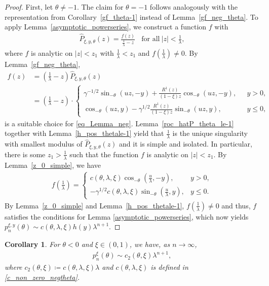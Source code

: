 \documentclass[12pt]{article}
\newcommand{\1}{\mathds{1}}
\theoremstyle{definition}
\theoremstyle{plain}
\newtheorem{Corollary}[definition]{Corollary}
\theoremstyle{remark}
\begin{document}
\begin{proof}
    First, let $\theta\neq -1$. The claim for $\theta=-1$ follows analogously with the representation from Corollary~\ref{gf_theta-1} instead of Lemma~\ref{gf_neg_theta}. To apply Lemma~\ref{asymptotic_powerseries}, we construct a function $f$ with
    \begin{align}
        \hat{P}_{\xi,y,\theta}(z)=\frac{f(z)}{\frac{1}{\lambda}-z}~~~~\text{for all}~|z|<\frac{1}{\lambda}\label{eq_Lemma_neg},
    \end{align}
   where $f$ is analytic on $|z|<z_1$ with $\frac{1}{\lambda}<z_1$ and $f\left(\frac{1}{\lambda}\right)\neq 0$. By Lemma~\ref{gf_neg_theta}, 
   \begin{align*}
        f(z)&=  \left(\frac{1}{\lambda}-z\right)\hat{P}_{\xi,y,\theta}(z)
        \\&=\left(\frac{1}{\lambda}-z\right)\cdot
      \begin{cases}
          \gamma^{-1/2}\sin_{-\theta}(uz,-y)+\frac{R^1(z)}{(1-\xi) z}\cos_{-\theta}(uz,-y),~~~&y>0,
          \\\cos_{-\theta}(uz,y)
     -\gamma^{1/2}\frac{R^1(z)}{(1-\xi) z}\sin_{-\theta}(uz,y),&y\le 0,
     \end{cases}
   \end{align*}
   is a suitable choice for \eqref{eq_Lemma_neg}. Lemma~\ref{roc_hatP_theta_le-1} together with Lemma~\ref{h_pos_thetale-1} yield that $\frac{1}{\lambda}$ is the unique singularity with smallest modulus of $\hat{P}_{\xi,y,\theta}(z)$ and it is simple and isolated. In particular, there is some $z_1>\frac{1}{\lambda}$ such that the function $f$ is analytic on $|z|<z_1$. By Lemma~\ref{z_0_simple}, we have
   \begin{align*}
       f\left(\frac{1}{\lambda}\right)=\begin{cases}
         c(\theta,\lambda,\xi)\cos_{-\theta}\left(\frac{u}{\lambda},-y\right),~~~&y>0,
          \\-\gamma^{1/2}c(\theta,\lambda,\xi)\sin_{-\theta}\left(\frac{u}{\lambda},y\right),&y\le 0.
     \end{cases}
   \end{align*}
 By Lemma~\ref{z_0_simple} and
  Lemma~\ref{h_pos_thetale-1}, $f\left(\frac{1}{\lambda}\right)\neq0$ and thus, $f$ satisfies the  conditions for Lemma \ref{asymptotic_powerseries}, which now yields $p_n^{\xi,y}(\theta)\sim c(\theta,\lambda,\xi)h(y)\lambda^{n+1}$.
\end{proof}
\begin{Corollary}\label{asymptotic_theta_neg_ohne_y}
      For $\theta<0$ and  $\xi\in(0,1)$, we have, as $n\to\infty$,
  \begin{align*}
       p_n^{\xi}(\theta)\sim c_2(\theta,\xi)\lambda^{n+1},
  \end{align*}
  where $c_2(\theta,\xi)\coloneqq c(\theta,\lambda,\xi)\lambda$ and $c(\theta,\lambda,\xi)$ is defined in \eqref{c_non_zero_negtheta}.
\end{Corollary}
\end{document}

